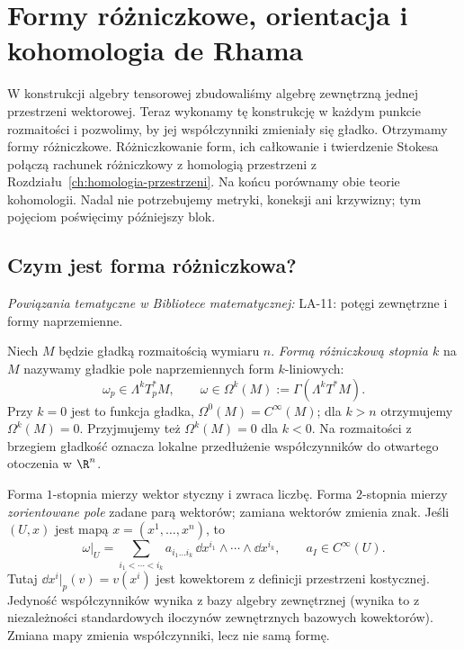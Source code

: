 \chapter{Formy różniczkowe, orientacja i kohomologia de Rhama}
\label{ch:formy-de-rham}

\providecommand{\atlasref}[2]{#2}


W konstrukcji algebry tensorowej zbudowaliśmy algebrę
zewnętrzną jednej przestrzeni wektorowej. Teraz wykonamy tę
konstrukcję w każdym punkcie rozmaitości i pozwolimy, by jej
współczynniki zmieniały się gładko. Otrzymamy formy różniczkowe.
Różniczkowanie form, ich całkowanie i twierdzenie Stokesa
połączą rachunek różniczkowy z homologią przestrzeni z
Rozdziału~\ref{ch:homologia-przestrzeni}. Na końcu porównamy
obie teorie kohomologii. Nadal nie potrzebujemy metryki,
koneksji ani krzywizny; tym pojęciom poświęcimy późniejszy blok.

\section{Czym jest forma różniczkowa?}
\label{sec:formy-definicje}

\noindent\emph{Powiązania tematyczne w Bibliotece matematycznej:} \atlasref{LA-11::thm:lin11-formy-alt}{LA-11: potęgi zewnętrzne i formy naprzemienne}.


\begin{definicja}
\label{def:forma-rozniczkowa}
Niech $M$ będzie gładką rozmaitością wymiaru $n$.
\emph{Formą różniczkową stopnia $k$} na $M$ nazywamy
gładkie pole naprzemiennych form $k$-liniowych:
\[
 \omega_p\in\Lambda^k T_p^*M,
 \qquad \omega\in\Omega^k(M)
 :=\Gamma(\Lambda^k T^*M).
\]
Przy $k=0$ jest to funkcja gładka,
$\Omega^0(M)=C^\infty(M)$; dla $k>n$ otrzymujemy
$\Omega^k(M)=0$. Przyjmujemy też $\Omega^k(M)=0$ dla $k<0$.
Na rozmaitości z brzegiem gładkość
oznacza lokalne przedłużenie współczynników do
otwartego otoczenia w $\R^n$.
\end{definicja}

Forma $1$-stopnia mierzy wektor styczny i zwraca liczbę.
Forma $2$-stopnia mierzy \emph{zorientowane pole} zadane
parą wektorów; zamiana wektorów zmienia znak.
Jeśli $(U,x)$ jest mapą $x=(x^1,\ldots,x^n)$, to
\begin{equation}\label{eq:forma-lokalna}
 \omega|_U=\sum_{i_1<\cdots<i_k}
 a_{i_1\ldots i_k}\,\dd x^{i_1}\wedge\cdots\wedge\dd x^{i_k},
 \qquad a_I\in C^\infty(U).
\end{equation}
Tutaj $\dd x^i|_p(v)=v(x^i)$ jest kowektorem z definicji przestrzeni kostycznej. Jedyność współczynników
wynika z bazy algebry zewnętrznej
(wynika to z niezależności standardowych iloczynów zewnętrznych bazowych kowektorów). Zmiana mapy zmienia
współczynniki, lecz nie samą formę.

